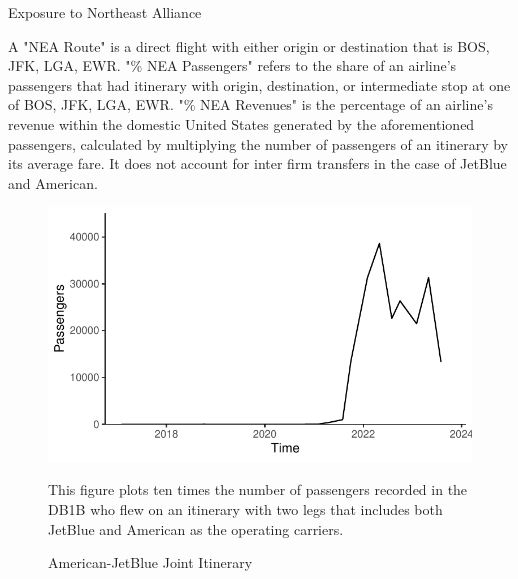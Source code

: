 \documentclass{article}
\begin{document}
\begin{appendices}
	\begin{landscape}
		\begin{table}
			\caption{Exposure to Northeast Alliance}
			\label{tab:NEA_Exposure}
			
			\begin{minipage}{\textwidth} %
				{\footnotesize A "NEA Route" is a direct flight with either origin or destination that is BOS, JFK, LGA, EWR. "\% NEA Passengers" refers to the share of an airline's passengers that had itinerary with origin, destination, or intermediate stop at one of BOS, JFK, LGA, EWR. "\% NEA Revenues"  is the percentage of an airline's revenue within the domestic United States generated by the aforementioned passengers, calculated by multiplying the number of passengers of an itinerary by its average fare. It does not account for inter firm transfers in the case of JetBlue and American.}
			\end{minipage}
		\end{table}
	\end{landscape}
	
		\begin{figure}
		\caption{American-JetBlue Joint Itinerary}
		\label{fig:NEA_Joint_Op}
		\includegraphics[width = \linewidth]{NEA_OPCarrier_Switch_Graph}
		\begin{minipage}{\textwidth} %
			{\footnotesize This figure plots ten times the number of passengers recorded in the DB1B who flew on an itinerary with two legs that includes both JetBlue and American as the operating carriers.}
		\end{minipage}
	\end{figure}
	

\end{appendices}
\end{document}

